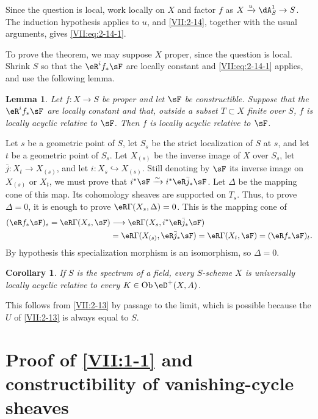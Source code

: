 \documentclass[12pt,oneside,english]{smfbook}
\DeclareMathOperator{\ob}{Ob}
\newcommand{\iso}{\xrightarrow\sim}
\newtheorem{lemma_}[subsection]{Lemma}
\newtheorem{corollary_}[subsection]{Corollary}
\begin{document}
Since the question is local, work locally on $X$ and factor $f$ as $X\xrightarrow{u}\dA_S^1\to S$. The induction hypothesis applies to $u$, and \ref{VII:2-14}, together with the usual arguments, gives \eqref{VII:eq:2-14-1}.

To prove the theorem, we may suppose $X$ proper, since the question is local. Shrink $S$ so that the $\eR^if_\ast\sF$ are locally constant and \eqref{VII:eq:2-14-1} applies, and use the following lemma.

\begin{lemma_}\label{VII:2-15}
Let $f:X\to S$ be proper and let $\sF$ be constructible. Suppose that the $\eR^if_\ast\sF$ are locally constant and that, outside a subset $T\subset X$ finite over $S$, $f$ is locally acyclic relative to $\sF$. Then $f$ is locally acyclic relative to $\sF$.
\end{lemma_}

Let $s$ be a geometric point of $S$, let $S_s$ be the strict localization of $S$ at $s$, and let $t$ be a geometric point of $S_s$. Let $X_{(s)}$ be the inverse image of $X$ over $S_s$, let $\bar j:X_t\to X_{(s)}$, and let $i:X_s\hookrightarrow X_{(s)}$. Still denoting by $\sF$ its inverse image on $X_{(s)}$ or $X_t$, we must prove that $i^\ast\sF\iso i^\ast\eR\bar j_\ast\sF$. Let $\Delta$ be the mapping cone of this map. Its cohomology sheaves are supported on $T_s$. Thus, to prove $\Delta=0$, it is enough to prove $\eR\Gamma(X_s,\Delta)=0$. This is the mapping cone of
\[
\begin{split}
  (\eR f_\ast\sF)_s=\eR\Gamma(X_s,\sF)
  &\longrightarrow
  \eR\Gamma(X_s,i^\ast\eR\bar j_\ast\sF)\\
  &=\eR\Gamma(X_{(s)},\eR\bar j_\ast\sF)
   =\eR\Gamma(X_t,\sF)=(\eR f_\ast\sF)_t.
\end{split}
\]
By hypothesis this specialization morphism is an isomorphism, so $\Delta=0$.

\begin{corollary_}\label{VII:2-16}
If $S$ is the spectrum of a field, every $S$-scheme $X$ is universally locally acyclic relative to every $K\in\ob\eD^+(X,A)$.
\end{corollary_}

This follows from \ref{VII:2-13} by passage to the limit, which is possible because the $U$ of \ref{VII:2-13} is always equal to $S$.

\section{Proof of \texorpdfstring{\ref{VII:1-1}}{1.1} and constructibility of vanishing-cycle sheaves}\label{VII:3}
\end{document}

